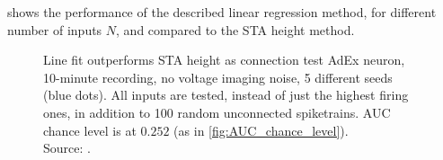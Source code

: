 
 shows the performance of the described linear regression method, for different number of inputs $N$, and compared to the STA height method.

\begin{figure}
    \captionn
        {Line fit outperforms STA height as connection test}
        {AdEx neuron, 10-minute recording, no voltage imaging noise,  5 different seeds (blue dots). All inputs are tested, instead of just the highest firing ones, in addition to 100 random unconnected spiketrains. AUC chance level is at $0.252$ (as in \cref{fig:AUC_chance_level}). \\
        Source: .}
    \label{fig:N_sweep__AUC__upstroke_vs_STA}
\end{figure}










